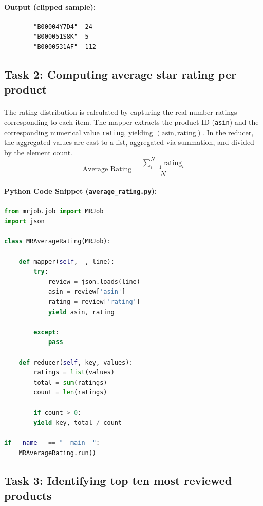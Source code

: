 \documentclass[12pt, a4paper]{article}
\begin{document}
	\paragraph{Output (clipped sample):}
	\begin{verbatim}
		"B00004Y7D4"  24
		"B000051S8K"  5
		"B0000531AF"  112
	\end{verbatim}

	
	\subsection{Task 2: Computing average star rating per product}
	\paragraph{} 
	The rating distribution is calculated by capturing the real number ratings corresponding to each item. The mapper extracts the product ID (\texttt{asin}) and the corresponding numerical value \texttt{rating}, yielding $(\text{asin}, \text{rating})$. In the reducer, the aggregated values are cast to a list, aggregated via summation, and divided by the element count.
	$$\text{Average Rating} = \frac{\sum_{i=1}^{N} \text{rating}_i}{N}$$
	
	\paragraph{Python Code Snippet (\texttt{average\_rating.py}):}
	\begin{lstlisting}[language=Python, caption={MapReduce job to calculate average star ratings.}]
from mrjob.job import MRJob
import json

class MRAverageRating(MRJob):

	def mapper(self, _, line):
		try:
			review = json.loads(line)
			asin = review['asin']
			rating = review['rating']
			yield asin, rating
		
		except:
			pass
		
	def reducer(self, key, values):
		ratings = list(values)
		total = sum(ratings)
		count = len(ratings)
	
		if count > 0:
		yield key, total / count
	
if __name__ == "__main__":
	MRAverageRating.run()
	\end{lstlisting}
	
	
	\subsection{Task 3: Identifying top ten most reviewed products}
\end{document}
